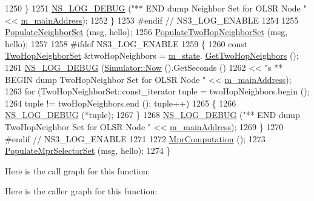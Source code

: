\begin{DoxyCode}
1250       \}
1251     \hyperlink{group__logging_ga413f1886406d49f59a6a0a89b77b4d0a}{NS\_LOG\_DEBUG} (\textcolor{stringliteral}{"** END dump Neighbor Set for OLSR Node "} << 
      \hyperlink{classns3_1_1olsr_1_1RoutingProtocol_a58cc50ed5d1039aab603e90e318aabfb}{m\_mainAddress});
1252   \}
1253 \textcolor{preprocessor}{#endif // NS3\_LOG\_ENABLE}
1254 
1255   \hyperlink{classns3_1_1olsr_1_1RoutingProtocol_a9a9cccf9682782a0b95539862b4e6b53}{PopulateNeighborSet} (msg, hello);
1256   \hyperlink{classns3_1_1olsr_1_1RoutingProtocol_a4a8eb48c32cebfa630bb7168882faa26}{PopulateTwoHopNeighborSet} (msg, hello);
1257 
1258 \textcolor{preprocessor}{#ifdef NS3\_LOG\_ENABLE}
1259   \{
1260     \textcolor{keyword}{const} \hyperlink{namespacens3_1_1olsr_a5f9963792af7fea4dc66fb8718394604}{TwoHopNeighborSet} &twoHopNeighbors = \hyperlink{classns3_1_1olsr_1_1RoutingProtocol_a07942ec1a7df71b609c8d2ff3b567c49}{m\_state}.
      \hyperlink{classns3_1_1olsr_1_1OlsrState_ab03738874d0d785b770beef6dc9c2e1a}{GetTwoHopNeighbors} ();
1261     \hyperlink{group__logging_ga413f1886406d49f59a6a0a89b77b4d0a}{NS\_LOG\_DEBUG} (\hyperlink{classns3_1_1Simulator_ac3178fa975b419f7875e7105be122800}{Simulator::Now} ().GetSeconds ()
1262                   << \textcolor{stringliteral}{"s ** BEGIN dump TwoHopNeighbor Set for OLSR Node "} << 
      \hyperlink{classns3_1_1olsr_1_1RoutingProtocol_a58cc50ed5d1039aab603e90e318aabfb}{m\_mainAddress});
1263     \textcolor{keywordflow}{for} (TwoHopNeighborSet::const\_iterator tuple = twoHopNeighbors.begin ();
1264          tuple != twoHopNeighbors.end (); tuple++)
1265       \{
1266         \hyperlink{group__logging_ga413f1886406d49f59a6a0a89b77b4d0a}{NS\_LOG\_DEBUG} (*tuple);
1267       \}
1268     \hyperlink{group__logging_ga413f1886406d49f59a6a0a89b77b4d0a}{NS\_LOG\_DEBUG} (\textcolor{stringliteral}{"** END dump TwoHopNeighbor Set for OLSR Node "} << 
      \hyperlink{classns3_1_1olsr_1_1RoutingProtocol_a58cc50ed5d1039aab603e90e318aabfb}{m\_mainAddress});
1269   \}
1270 \textcolor{preprocessor}{#endif // NS3\_LOG\_ENABLE}
1271 
1272   \hyperlink{classns3_1_1olsr_1_1RoutingProtocol_a947ab35f39d191ed51d3fbb7c1cc282c}{MprComputation} ();
1273   \hyperlink{classns3_1_1olsr_1_1RoutingProtocol_a56bce0e7794315308e10e5fd1343cfaf}{PopulateMprSelectorSet} (msg, hello);
1274 \}
\end{DoxyCode}


Here is the call graph for this function\+:




Here is the caller graph for this function\+:


